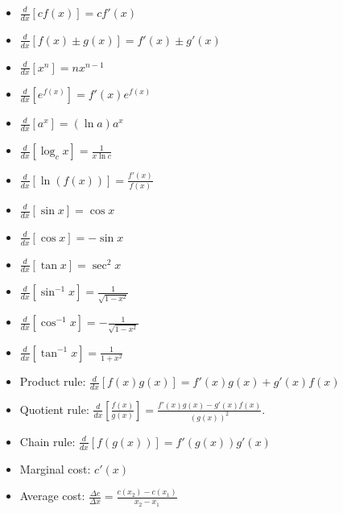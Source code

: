 \documentclass{report}
\begin{document}
\setlength{\columnsep}{3cm}
\begin{multicols}{2}
\setlength{\columnseprule}{.4pt}

\newcommand{\der}[1]{\displaystyle \frac{d}{dx} \left[ #1 \right]}

\begin{itemize}[leftmargin=.25cm]

\item $ \der{c f(x)} = c f'(x) $

\item $ \der{f(x) \pm g(x)} = f'(x) \pm g'(x) $

\item $ \der{x^n} = n x^{n-1} $

\item $ \der{e^{f(x)}} = f'(x) e^{f(x)} $

\item $ \der{a^{x}} = \left( \ln a \right) a^x $

\item $ \der{ \log_c x } = \frac{1}{x \ln c} $

\item $ \der{ \ln \left( f(x) \right) } = \frac{f'(x)}{f(x)} $

\item $ \der{ \sin x } = \cos x $

\item $ \der{ \cos x } = - \sin x $

\item $ \der{ \tan x } = \sec^2 x $

\item $ \der{ \sin^{-1} x } = \frac{1}{\sqrt{1-x^2}} $

\item $ \der{ \cos^{-1} x } = - \frac{1}{\sqrt{1-x^2}} $

\item $ \der{ \tan^{-1} x } = \frac{1}{1+x^2} $

\item Product rule: $ \der{f(x) g(x)} = f'(x) g(x) + g'(x) f(x) $

\item Quotient rule: $ \der{\frac{f(x)}{g(x)} } = \frac{f'(x) g(x) - g'(x) f(x)}{(g(x))^2} $.

\item Chain rule: $ \der{f(g(x))} = f'(g(x)) g'(x) $ 

\item Marginal cost: $\displaystyle c'(x) $

\item Average cost: $\displaystyle \frac{\Delta c}{\Delta x} = \frac{c(x_2) - c(x_1)}{x_2-x_1} $

\end{itemize}

\vfill
\end{multicols}
\end{document}
